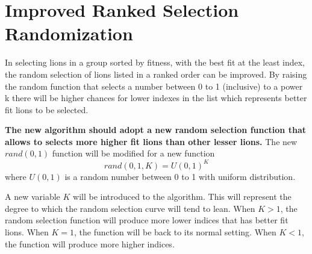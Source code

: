 \section{Improved Ranked Selection Randomization}

\par In selecting lions in a group sorted by fitness, with the best fit at the least index, the random selection of lions listed in a ranked order can be improved. By raising the random function that selects a number between 0 to 1 (inclusive) to a power k there will be higher chances for lower indexes in the list which represents better fit lions to be selected.

\par \textbf{The new algorithm should adopt a new random selection function that allows to selects more higher fit lions than other lesser lions.} The new $rand(0,1)$ function will be modified for a new function
$$
rand(0,1,K) = U(0,1)^K
$$
where $U(0,1)$ is a random number between 0 to 1 with uniform distribution.

\par A new variable $K$ will be introduced to the algorithm. This will represent the degree to which the random selection curve will tend to lean. When $K > 1$, the random selection function will produce more lower indices that has better fit lions. When $K = 1$, the function will be back to its normal setting. When $K < 1$, the function will produce more higher indices.
